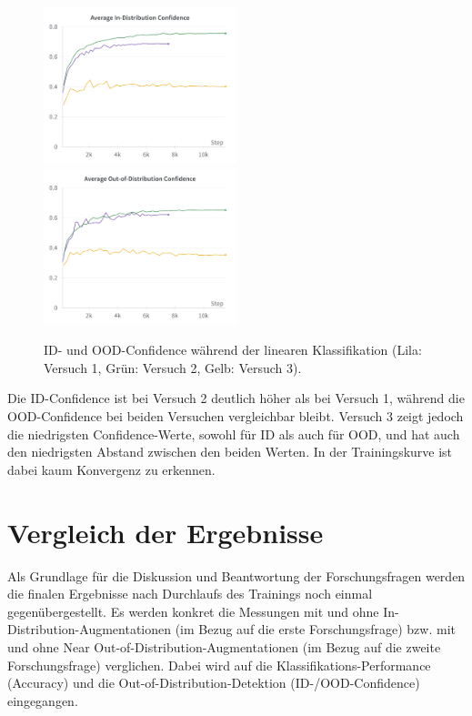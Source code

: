 \begin{figure}[h]
	\centering
	\includegraphics[width=0.5\textwidth]{images/figure_results_supcon-lin_avg-id-conf.png}%
	\includegraphics[width=0.5\textwidth]{images/figure_results_supcon-lin_avg-ood-conf.png}
	\caption[ID- und OOD-Confidence während der linearen Klassifikation.]{ID- und OOD-Confidence während der linearen Klassifikation (\textcolor{exp1}{Lila}: Versuch 1, \textcolor{exp2}{Grün}: Versuch 2, \textcolor{exp3}{Gelb}: Versuch 3).}
	\label{fig:supcon-lin-ood-detection}
\end{figure}

Die ID-Confidence ist bei Versuch 2 deutlich höher als bei Versuch 1, während die OOD-Confidence bei beiden Versuchen vergleichbar bleibt. Versuch 3 zeigt jedoch die niedrigsten Confidence-Werte, sowohl für ID als auch für OOD, und hat auch den niedrigsten Abstand zwischen den beiden Werten. In der Trainingskurve ist dabei kaum Konvergenz zu erkennen.

\section{Vergleich der Ergebnisse} \label{sec:results-comparison}

Als Grundlage für die Diskussion und Beantwortung der Forschungsfragen werden die finalen Ergebnisse nach Durchlaufs des Trainings noch einmal gegenübergestellt. Es werden konkret die Messungen mit und ohne In-Distribution-Augmentationen (im Bezug auf die erste Forschungsfrage) bzw. mit und ohne Near Out-of-Distribution-Augmentationen (im Bezug auf die zweite Forschungsfrage) verglichen. Dabei wird auf die Klassifikations-Performance (Accuracy) und die Out-of-Distribution-Detektion (ID-/OOD-Confidence) eingegangen.

